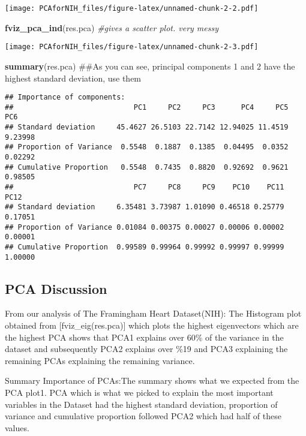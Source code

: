 \documentclass[]{article}
\newenvironment{Shaded}{\begin{snugshade}}{\end{snugshade}}
\newcommand{\KeywordTok}[1]{\textcolor[rgb]{0.13,0.29,0.53}{\textbf{#1}}}
\newcommand{\CommentTok}[1]{\textcolor[rgb]{0.56,0.35,0.01}{\textit{#1}}}
\newcommand{\NormalTok}[1]{#1}
\begin{document}
\texttt{[image: PCAforNIH\_files/figure-latex/unnamed-chunk-2-2.pdf]}

\begin{Shaded}
\begin{Highlighting}[]
\KeywordTok{fviz_pca_ind}\NormalTok{(res.pca) }\CommentTok{#gives a scatter plot. very messy}
\end{Highlighting}
\end{Shaded}

\texttt{[image: PCAforNIH\_files/figure-latex/unnamed-chunk-2-3.pdf]}

\begin{Shaded}
\begin{Highlighting}[]
\KeywordTok{summary}\NormalTok{(res.pca) ##As you can see, principal components 1 and 2 have the highest standard deviation, use them}
\end{Highlighting}
\end{Shaded}

\begin{verbatim}
## Importance of components:
##                            PC1     PC2     PC3      PC4     PC5     PC6
## Standard deviation     45.4627 26.5103 22.7142 12.94025 11.4519 9.23998
## Proportion of Variance  0.5548  0.1887  0.1385  0.04495  0.0352 0.02292
## Cumulative Proportion   0.5548  0.7435  0.8820  0.92692  0.9621 0.98505
##                            PC7     PC8     PC9    PC10    PC11    PC12
## Standard deviation     6.35481 3.73987 1.01090 0.46518 0.25779 0.17051
## Proportion of Variance 0.01084 0.00375 0.00027 0.00006 0.00002 0.00001
## Cumulative Proportion  0.99589 0.99964 0.99992 0.99997 0.99999 1.00000
\end{verbatim}

\subsection{PCA Discussion}\label{pca-discussion}

From our analysis of The Framingham Heart Dataset(NIH): The Histogram
plot obtained from {[}fviz\_eig(res.pca){]} which plots the highest
eigenvectors which are the highest PCA shows that PCA1 explains over
60\% of the variance in the dataset and subsequently PCA2 explains over
\%19 and PCA3 explaining the remaining PCAs explaining the remaining
variance.

Summary Importance of PCAs:The summary shows what we expected from the
PCA plot1. PCA which is what we picked to explain the most important
variables in the Dataset had the highest standard deviation, proportion
of variance and cumulative proportion followed PCA2 which had half of
these values.
\end{document}
